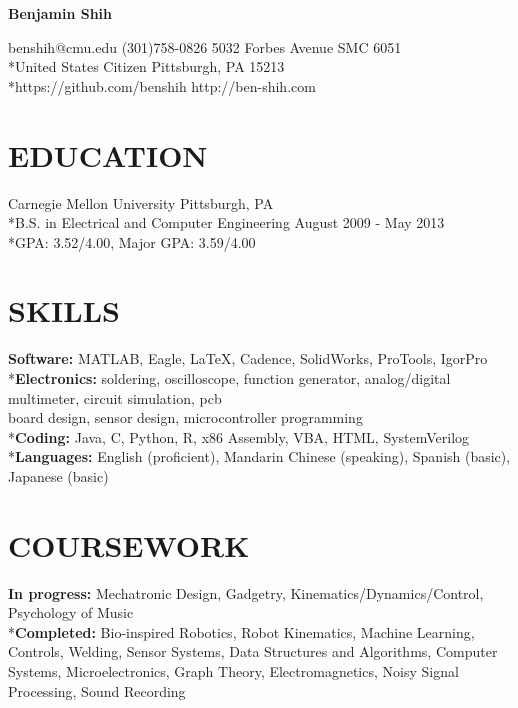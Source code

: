 \documentclass{res}
\begin{document}
 

\begin{center}
{\Large \textbf{Benjamin Shih}}
\end{center}
\vspace{-0.2in}
benshih@cmu.edu (301)758-0826 \hfill 5032 Forbes Avenue SMC 6051
\\*United States Citizen \hfill Pittsburgh, PA 15213
\\*https://github.com/benshih \hfill http://ben-shih.com


\vspace{-0.1in}
\section{EDUCATION}
\vspace{0.05in} 
 
Carnegie Mellon University \hfill Pittsburgh, PA
\\*B.S. in Electrical and Computer Engineering \hfill August 2009 - May 2013
\\*GPA: 3.52/4.00, Major GPA: 3.59/4.00

\vspace{-0.1in}
\section{SKILLS}
\vspace{0.05in}
{\bf Software: } MATLAB, Eagle, LaTeX, Cadence, SolidWorks, ProTools, IgorPro
\\*{\bf Electronics: } soldering, oscilloscope, function generator, analog/digital multimeter, circuit simulation, pcb\\
\indent board design, sensor design, microcontroller programming
\\*{\bf Coding: } Java, C, Python, R, x86 Assembly, VBA, HTML, SystemVerilog
\\*{\bf Languages: } English (proficient), Mandarin Chinese (speaking), Spanish (basic), Japanese (basic)

\vspace{-0.1in}
\section{COURSEWORK} 
\vspace{0.05in} 
 {\bf In progress:} Mechatronic Design, Gadgetry, Kinematics/Dynamics/Control, Psychology of Music
 \\*{\bf Completed:} Bio-inspired Robotics, Robot Kinematics, Machine Learning, Controls, Welding, Sensor Systems, Data Structures and Algorithms, Computer Systems, Microelectronics, Graph Theory, Electromagnetics, Noisy Signal Processing, Sound Recording
\end{document}
